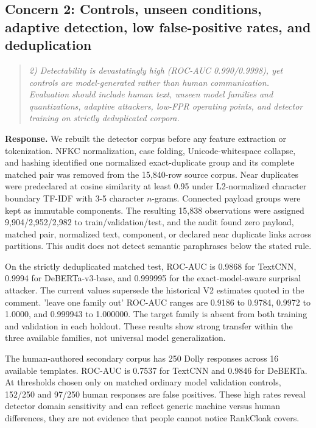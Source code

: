 \documentclass[11pt]{article}
\newenvironment{reviewcomment}{\begin{quote}\color{commentgray}\itshape}{\end{quote}}
\begin{document}
\subsection*{Concern 2: Controls, unseen conditions, adaptive detection, low false-positive rates, and deduplication}

\begin{reviewcomment}
2) Detectability is devastatingly high (ROC-AUC 0.990/0.9998), yet controls are model-generated rather than human communication. Evaluation should include human text, unseen model families and quantizations, adaptive attackers, low-FPR operating points, and detector training on strictly deduplicated corpora.
\end{reviewcomment}


\noindent\textbf{Response.}
We rebuilt the detector corpus before any feature extraction or tokenization. NFKC normalization, case folding, Unicode-whitespace collapse, and hashing identified one normalized exact-duplicate group and its complete matched pair was removed from the 15,840-row source corpus. Near duplicates were predeclared at cosine similarity at least 0.95 under L2-normalized character boundary TF-IDF with 3-5 character \(n\)-grams. Connected payload groups were kept as immutable components. The resulting 15,838 observations were assigned 9,904/2,952/2,982 to train/validation/test, and the audit found zero payload, matched pair, normalized text, component, or declared near duplicate links across partitions. This audit does not detect semantic paraphrases below the stated rule.

On the strictly deduplicated matched test, ROC-AUC is 0.9868 for TextCNN, 0.9994 for DeBERTa-v3-base, and 0.999995 for the exact-model-aware surprisal attacker. The current values supersede the historical V2 estimates quoted in the comment.
'leave one family out' ROC-AUC ranges are 0.9186 to 0.9784, 0.9972 to 1.0000, and 0.999943 to 1.000000. The target family is absent from both training and validation in each holdout. These results show strong transfer within the three available families, not universal model generalization.

The human-authored secondary corpus has 250 Dolly responses across 16 available templates.  ROC-AUC is 0.7537 for TextCNN and 0.9846 for DeBERTa. At thresholds chosen only on matched ordinary model validation controls, 152/250 and 97/250 human responses are false positives. These high rates reveal detector domain sensitivity and can reflect generic machine versus human differences, they are not evidence that people cannot notice RankCloak covers.
\end{document}
